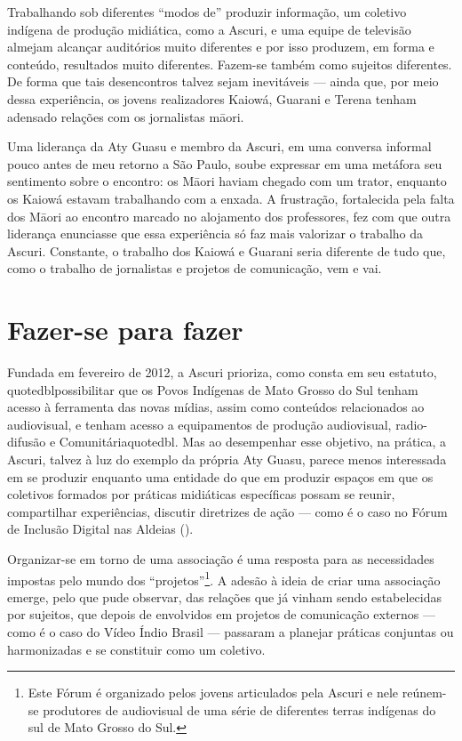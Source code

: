 Trabalhando sob diferentes ``modos de'' produzir informação, um coletivo
indígena de produção midiática, como a Ascuri, e uma equipe de
televisão almejam alcançar auditórios muito diferentes e por isso
produzem, em forma e conteúdo, resultados muito diferentes. Fazem-se
também como sujeitos diferentes. De forma que tais desencontros talvez
sejam inevitáveis --- ainda que, por meio dessa experiência, os jovens
realizadores Kaiowá, Guarani e Terena tenham adensado relações com os
jornalistas m\=aori.

Uma liderança da Aty Guasu e membro da Ascuri, em uma conversa informal
pouco antes de meu retorno a São Paulo, soube expressar em uma metáfora
seu sentimento sobre o encontro: os M\=aori haviam chegado com um
trator, enquanto os Kaiowá estavam trabalhando com a enxada. A
frustração, fortalecida pela falta dos M\=aori ao encontro marcado no
alojamento dos professores, fez com que outra liderança enunciasse que
essa experiência só faz mais valorizar o trabalho da Ascuri. Constante,
o trabalho dos Kaiowá e Guarani seria diferente de tudo que, como o
trabalho de jornalistas e projetos de comunicação, vem e vai.

\section{Fazer-se para fazer}

Fundada em fevereiro de 2012, a Ascuri prioriza, como consta em seu
estatuto, {quotedbl}possibilitar que os Povos Indígenas de Mato
Grosso do Sul tenham acesso à ferramenta das novas mídias, assim como
conteúdos relacionados ao audiovisual, e tenham acesso a equipamentos
de produção audiovisual, radio-difusão e  Comunitária{quotedbl}.
Mas ao desempenhar esse objetivo, na prática, a Ascuri, talvez à luz do
exemplo da própria Aty Guasu, parece menos interessada em se produzir
enquanto uma entidade do que em produzir espaços em que os coletivos
formados por práticas midiáticas específicas possam se reunir,
compartilhar experiências, discutir diretrizes de ação --- como é o caso
no Fórum de Inclusão Digital nas Aldeias ().

Organizar-se em torno de uma associação é uma resposta para as
necessidades impostas pelo mundo dos ``projetos''\footnote{Este Fórum é
organizado pelos jovens articulados pela Ascuri e nele reúnem-se
produtores de audiovisual de uma série de diferentes terras indígenas
do sul de Mato Grosso do Sul. }. A adesão à ideia de criar uma
associação emerge, pelo que pude observar, das relações que já vinham
sendo estabelecidas por sujeitos, que depois de envolvidos em projetos
de comunicação externos --- como é o caso do Vídeo Índio Brasil ---
passaram a planejar práticas conjuntas ou harmonizadas e se constituir
como um coletivo.

